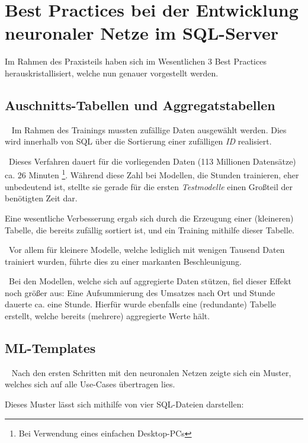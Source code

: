 \section[Best Practices]{Best Practices bei der Entwicklung neuronaler Netze im SQL-Server}
\label{sec:BestPractices}
Im Rahmen des Praxisteils haben sich im Wesentlichen 3 Best Practices herauskristallisiert, welche nun genauer vorgestellt werden. 

\subsection{Auschnitts-Tabellen und Aggregatstabellen} ~\newline
Im Rahmen des Trainings mussten zufällige Daten ausgewählt werden. Dies wird innerhalb von SQL über die Sortierung einer zufälligen \textit{ID} realisiert. 

~\newline Dieses Verfahren dauert für die vorliegenden Daten (113 Millionen Datensätze) ca. 26 Minuten \footnote{Bei Verwendung eines einfachen Desktop-PCs}. Während diese Zahl bei Modellen, die Stunden trainieren, eher unbedeutend ist, stellte sie gerade für die ersten \textit{Testmodelle} einen Großteil der benötigten Zeit dar. 

Eine wesentliche Verbesserung ergab sich durch die Erzeugung einer (kleineren) Tabelle, die bereits zufällig sortiert ist, und ein Training mithilfe dieser Tabelle. 

~\newline Vor allem für kleinere Modelle, welche lediglich mit wenigen Tausend Daten trainiert wurden, führte dies zu einer markanten Beschleunigung.

~\newline Bei den Modellen, welche sich auf aggregierte Daten stützen, fiel dieser Effekt noch größer aus: Eine Aufsummierung des Umsatzes nach Ort und Stunde dauerte ca. eine Stunde. Hierfür wurde ebenfalls eine (redundante) Tabelle erstellt, welche bereits (mehrere) aggregierte Werte hält. 

\subsection{ML-Templates} ~\newline
Nach den ersten Schritten mit den neuronalen Netzen zeigte sich ein Muster, welches sich auf alle Use-Cases übertragen lies. 

Dieses Muster lässt sich mithilfe von vier SQL-Dateien darstellen:

